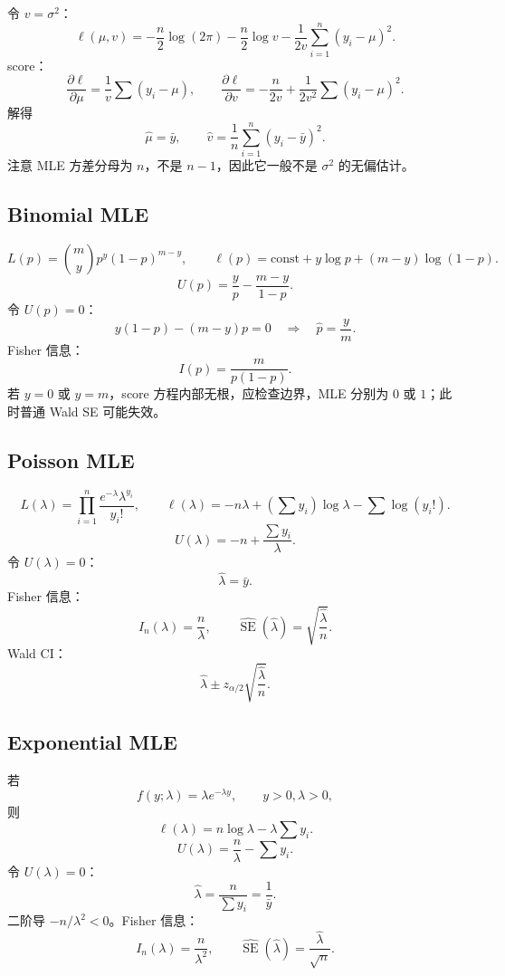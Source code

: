 \documentclass[11pt,a4paper]{article}
\newcommand{\SE}{\operatorname{SE}}
\begin{document}
\begin{proofbox}[正态均值和方差都未知]
令 $v=\sigma^2$：
\[
  \ell(\mu,v)
  =
  -\frac n2\log(2\pi)
  -\frac n2\log v
  -\frac1{2v}\sum_{i=1}^n(y_i-\mu)^2.
\]
score：
\[
  \frac{\partial\ell}{\partial\mu}
  =
  \frac1v\sum(y_i-\mu),
  \qquad
  \frac{\partial\ell}{\partial v}
  =
  -\frac n{2v}
  +
  \frac1{2v^2}\sum(y_i-\mu)^2.
\]
解得
\[
  \boxed{\hat\mu=\bar y},
  \qquad
  \boxed{\hat v=\frac1n\sum_{i=1}^n(y_i-\bar y)^2}.
\]
注意 MLE 方差分母为 $n$，不是 $n-1$，因此它一般不是 $\sigma^2$ 的无偏估计。
\end{proofbox}

\subsection{Binomial MLE}

\begin{proofbox}[二项分布单个观测]
\[
  L(p)=\binom myp^y(1-p)^{m-y},
  \qquad
  \ell(p)=\mathrm{const}+y\log p+(m-y)\log(1-p).
\]
\[
  U(p)=\frac yp-\frac{m-y}{1-p}.
\]
令 $U(p)=0$：
\[
  y(1-p)-(m-y)p=0
  \quad\Rightarrow\quad
  \boxed{\hat p=\frac ym}.
\]
Fisher 信息：
\[
  I(p)=\frac{m}{p(1-p)}.
\]
若 $y=0$ 或 $y=m$，score 方程内部无根，应检查边界，MLE 分别为 $0$ 或 $1$；此时普通 Wald SE 可能失效。
\end{proofbox}

\subsection{Poisson MLE}

\begin{proofbox}
\[
  L(\lambda)
  =
  \prod_{i=1}^n\frac{e^{-\lambda}\lambda^{y_i}}{y_i!},
  \qquad
  \ell(\lambda)
  =
  -n\lambda+\left(\sum y_i\right)\log\lambda-\sum\log(y_i!).
\]
\[
  U(\lambda)
  =
  -n+\frac{\sum y_i}{\lambda}.
\]
令 $U(\lambda)=0$：
\[
  \boxed{\hat\lambda=\bar y}.
\]
Fisher 信息：
\[
  I_n(\lambda)=\frac n\lambda,
  \qquad
  \widehat{\SE}(\hat\lambda)=\sqrt{\frac{\hat\lambda}{n}}.
\]
Wald CI：
\[
  \hat\lambda\pm z_{\alpha/2}\sqrt{\frac{\hat\lambda}{n}}.
\]
\end{proofbox}

\subsection{Exponential MLE}

\begin{proofbox}
若
\[
  f(y;\lambda)=\lambda e^{-\lambda y},
  \qquad y>0,\lambda>0,
\]
则
\[
  \ell(\lambda)=n\log\lambda-\lambda\sum y_i.
\]
\[
  U(\lambda)=\frac n\lambda-\sum y_i.
\]
令 $U(\lambda)=0$：
\[
  \boxed{\hat\lambda=\frac n{\sum y_i}=\frac1{\bar y}}.
\]
二阶导 $-n/\lambda^2<0$。Fisher 信息：
\[
  I_n(\lambda)=\frac n{\lambda^2},
  \qquad
  \widehat{\SE}(\hat\lambda)=\frac{\hat\lambda}{\sqrt n}.
\]
\end{proofbox}
\end{document}
